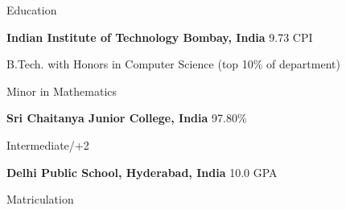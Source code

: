 
\begin{rubric}{Education}

\entry*[2019 -- Present]%
	\textbf{Indian Institute of Technology Bombay, India} \hfill 9.73 CPI
	\par B.Tech. with Honors in Computer Science \hfill (top 10\% of department)
	\par Minor in Mathematics


\entry*[2017 -- 2019]%
	\textbf{Sri Chaitanya Junior College, India} \hfill 97.80\% \par
	Intermediate/+2
	

\entry*[2010 -- 2017]%
	\textbf{Delhi Public School, Hyderabad, India} \hfill 10.0 GPA \par
	Matriculation
\end{rubric}